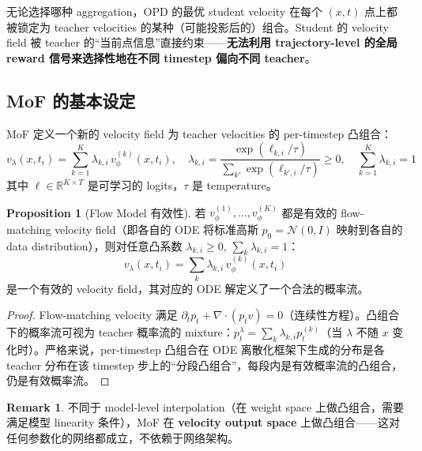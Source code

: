 \documentclass[11pt,a4paper]{article}
\newcommand{\R}{\mathbb{R}}
\newcommand{\N}{\mathcal{N}}
\newcommand{\vphi}{v_\phi}
\theoremstyle{definition}
\newtheorem{remark}{Remark}
\newtheorem{proposition}{Proposition}
\begin{document}
\begin{tcolorbox}[colback=red!5, colframe=red!50, title=OPD 的根本限制]
无论选择哪种 aggregation，OPD 的最优 student velocity 在每个 $(x, t)$ 点上都被锁定为 teacher velocities 的某种（可能投影后的）组合。Student 的 velocity field 被 teacher 的``当前点信息''直接约束——\textbf{无法利用 trajectory-level 的全局 reward 信号来选择性地在不同 timestep 偏向不同 teacher}。
\end{tcolorbox}

\subsection{MoF 的基本设定}

MoF 定义一个新的 velocity field 为 teacher velocities 的 per-timestep 凸组合：
\begin{equation}
v_{\lambda}(x, t_i) = \sum_{k=1}^K \lambda_{k,i}\, \vphi^{(k)}(x, t_i), \quad
\lambda_{k,i} = \frac{\exp(\ell_{k,i}/\tau)}{\sum_{k'}\exp(\ell_{k',i}/\tau)} \geq 0, \quad \sum_{k=1}^K \lambda_{k,i} = 1
\label{eq:mof_velocity}
\end{equation}
其中 $\ell \in \R^{K \times T}$ 是可学习的 logits，$\tau$ 是 temperature。

\begin{proposition}[Flow Model 有效性]
\label{prop:convex_flow}
若 $\vphi^{(1)}, \ldots, \vphi^{(K)}$ 都是有效的 flow-matching velocity field（即各自的 ODE 将标准高斯 $p_0 = \N(0, I)$ 映射到各自的 data distribution），则对任意凸系数 $\lambda_{k,i} \geq 0$, $\sum_k \lambda_{k,i} = 1$：
\begin{equation}
v_\lambda(x, t_i) = \sum_k \lambda_{k,i}\, \vphi^{(k)}(x, t_i)
\end{equation}
是一个有效的 velocity field，其对应的 ODE 解定义了一个合法的概率流。
\end{proposition}

\begin{proof}
Flow-matching velocity 满足 $\partial_t p_t + \nabla \cdot (p_t v) = 0$（连续性方程）。凸组合下的概率流可视为 teacher 概率流的 mixture：$p_t^\lambda = \sum_k \lambda_{k,i} p_t^{(k)}$（当 $\lambda$ 不随 $x$ 变化时）。严格来说，per-timestep 凸组合在 ODE 离散化框架下生成的分布是各 teacher 分布在该 timestep 步上的``分段凸组合''，每段内是有效概率流的凸组合，仍是有效概率流。
\end{proof}

\begin{remark}
不同于 model-level interpolation（在 weight space 上做凸组合，需要满足模型 linearity 条件），MoF 在 \textbf{velocity output space} 上做凸组合——这对任何参数化的网络都成立，不依赖于网络架构。
\end{remark}
\end{document}
